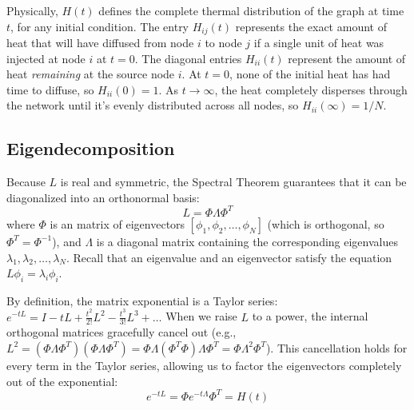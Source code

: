 \documentclass[11pt]{article}
\begin{document}
Physically, $H(t)$ defines the complete thermal distribution of the graph at time $t$, for any initial condition. The entry $H_{ij}(t)$ represents the exact amount of heat that will have diffused from node $i$ to node $j$ if a single unit of heat was injected at node $i$ at $t=0$. The diagonal entries $H_{ii}(t)$ represent the amount of heat \textit{remaining} at the source node $i$. At $t=0$, none of the initial heat has had time to diffuse, so $H_{ii}(0) = 1$. As $t \to \infty$, the heat completely disperses through the network until it's evenly distributed across all nodes, so $H_{ii}(\infty) = 1/N$.

\subsection{Eigendecomposition}
Because $L$ is real and symmetric, the Spectral Theorem guarantees that it can be diagonalized into an orthonormal basis:
\begin{equation}
    L = \Phi \Lambda \Phi^T
\end{equation}
where $\Phi$ is an matrix of eigenvectors $[\phi_1, \phi_2, \dots, \phi_N]$ (which is orthogonal, so $\Phi^T  = \Phi^{-1}$), and $\Lambda$ is a diagonal matrix containing the corresponding eigenvalues $\lambda_1, \lambda_2, \dots, \lambda_N$. Recall that an eigenvalue and an eigenvector satisfy the equation $L\phi_i = \lambda_i \phi_i$. 

By definition, the matrix exponential is a Taylor series: $e^{-tL} = I - tL + \frac{t^2}{2!}L^2 - \frac{t^3}{3!}L^3 + \dots$ 
When we raise $L$ to a power, the internal orthogonal matrices gracefully cancel out (e.g., $L^2 = (\Phi \Lambda \Phi^T)(\Phi \Lambda \Phi^T) = \Phi \Lambda (\Phi^T \Phi) \Lambda \Phi^T = \Phi \Lambda^2 \Phi^T$). This cancellation holds for every term in the Taylor series, allowing us to factor the eigenvectors completely out of the exponential:
\begin{equation}
    e^{-tL} = \Phi e^{-t\Lambda} \Phi^T = H(t)
\end{equation}
\end{document}
